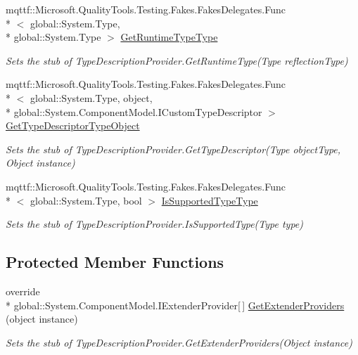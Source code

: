 \begin{DoxyCompactItemize}
mqttf\-::\-Microsoft.\-Quality\-Tools.\-Testing.\-Fakes.\-Fakes\-Delegates.\-Func\\*
$<$ global\-::\-System.\-Type, \\*
global\-::\-System.\-Type $>$ \hyperlink{class_system_1_1_component_model_1_1_fakes_1_1_stub_type_description_provider_a3cb558ac64fc3fa289a3f76fc37fea19}{Get\-Runtime\-Type\-Type}
\begin{DoxyCompactList}\small\item\em Sets the stub of Type\-Description\-Provider.\-Get\-Runtime\-Type(\-Type reflection\-Type)\end{DoxyCompactList}\item 
mqttf\-::\-Microsoft.\-Quality\-Tools.\-Testing.\-Fakes.\-Fakes\-Delegates.\-Func\\*
$<$ global\-::\-System.\-Type, object, \\*
global\-::\-System.\-Component\-Model.\-I\-Custom\-Type\-Descriptor $>$ \hyperlink{class_system_1_1_component_model_1_1_fakes_1_1_stub_type_description_provider_a616d8f736476a94e9cfe13bbf5fc1d43}{Get\-Type\-Descriptor\-Type\-Object}
\begin{DoxyCompactList}\small\item\em Sets the stub of Type\-Description\-Provider.\-Get\-Type\-Descriptor(\-Type object\-Type, Object instance)\end{DoxyCompactList}\item 
mqttf\-::\-Microsoft.\-Quality\-Tools.\-Testing.\-Fakes.\-Fakes\-Delegates.\-Func\\*
$<$ global\-::\-System.\-Type, bool $>$ \hyperlink{class_system_1_1_component_model_1_1_fakes_1_1_stub_type_description_provider_af5ce25303ef455353bbb732e4a56b77c}{Is\-Supported\-Type\-Type}
\begin{DoxyCompactList}\small\item\em Sets the stub of Type\-Description\-Provider.\-Is\-Supported\-Type(\-Type type)\end{DoxyCompactList}\end{DoxyCompactItemize}
\subsection*{Protected Member Functions}
\begin{DoxyCompactItemize}
\item 
override \\*
global\-::\-System.\-Component\-Model.\-I\-Extender\-Provider\mbox{[}$\,$\mbox{]} \hyperlink{class_system_1_1_component_model_1_1_fakes_1_1_stub_type_description_provider_a779fe51baa31bd7df3332ae0cb3c2602}{Get\-Extender\-Providers} (object instance)
\begin{DoxyCompactList}\small\item\em Sets the stub of Type\-Description\-Provider.\-Get\-Extender\-Providers(\-Object instance)\end{DoxyCompactList}\end{DoxyCompactItemize}

